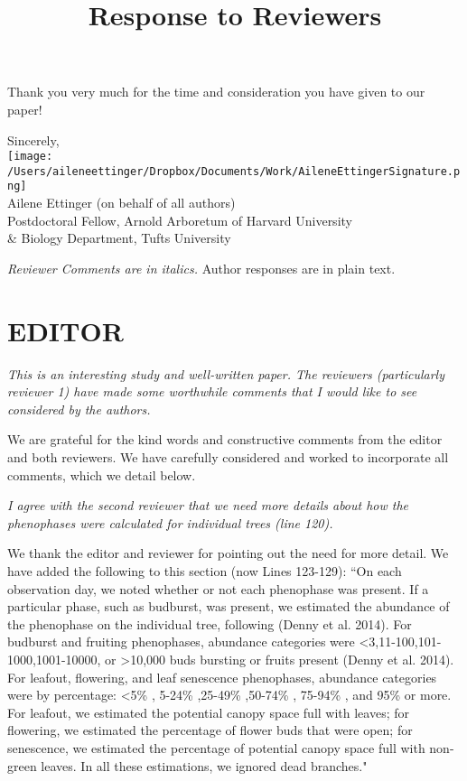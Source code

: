 \documentclass[10.95pt,a4paper]{letter}
\begin{document}
\begin{letter}{}
Thank you very much for the time and consideration you have given to our paper!

Sincerely,\\

\texttt{[image: /Users/aileneettinger/Dropbox/Documents/Work/AileneEttingerSignature.png]} \\
Ailene Ettinger (on behalf of all authors)\\
Postdoctoral Fellow, Arnold Arboretum of Harvard University \\ \& Biology Department, Tufts University

\end{letter}
\clearpage

\title{Response to Reviewers}
 \emph{Reviewer Comments are in italics.} Author responses are in plain text.

\section {EDITOR}
\par \emph{This is an interesting study and well-written paper.  The reviewers (particularly reviewer 1) have made some worthwhile comments that I would like to see considered by the authors.}
\par We are grateful for the kind words and constructive comments from the editor and both reviewers. We have carefully considered and worked to incorporate all comments, which we detail below.

\par \emph{I agree with the second reviewer that we need more details about how the phenophases were calculated for individual trees (line 120). }
\par We thank the editor and reviewer for pointing out the need for more detail. We have added the following to this section (now Lines 123-129): 
``On each observation day, we noted whether or not each phenophase was present. If a particular phase, such as budburst, was present, we estimated the abundance of the phenophase on the individual tree, following (Denny et al. 2014). For budburst and fruiting phenophases, abundance categories were \textless 3,11-100,101-1000,1001-10000, or \textgreater10,000 buds bursting or fruits present (Denny et al. 2014). For leafout, flowering, and leaf senescence phenophases, abundance categories were by percentage: \textless 5\% , 5-24\% ,25-49\% ,50-74\% , 75-94\% , and 95\%  or more. For leafout, we estimated the potential canopy space full with leaves; for flowering, we estimated the percentage of flower buds that were open; for senescence, we estimated the percentage of potential canopy space full with non-green leaves. In all these estimations, we ignored dead branches." 
\end{document}
